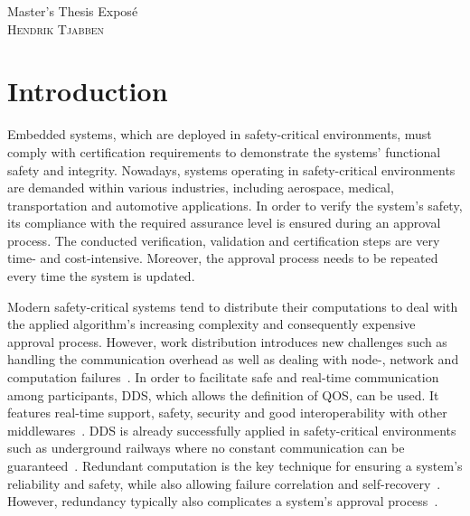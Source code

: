 \documentclass[a4paper, 12pt]{scrartcl}
\begin{document}
\begin{center}
  \Huge{Master's Thesis Expos\'{e}}\\
  \large{\textsc{Hendrik Tjabben}}
\end{center}


\section*{Introduction}
Embedded systems, which are deployed in safety-critical environments, must comply with certification requirements to demonstrate the systems' functional safety and integrity.
Nowadays, systems operating in safety-critical environments are demanded within various industries, including aerospace, medical, transportation and automotive applications.
In order to verify the system's safety, its compliance with the required assurance level is ensured during an approval process.
The conducted verification, validation and certification steps are very time- and cost-intensive.
Moreover, the approval process needs to be repeated every time the system is updated.

Modern safety-critical systems tend to distribute their computations to deal with the applied algorithm's increasing complexity and consequently expensive approval process.
However, work distribution introduces new challenges such as handling the communication overhead as well as dealing with node-, network and computation failures~\cite{DistributedSafety2020}.
In order to facilitate safe and real-time communication among participants, \ac{DDS}, which allows the definition of \ac{QOS}, can be used.
It features real-time support, safety, security and good interoperability with other middlewares~\cite{DistributedSafety2020}.
\ac{DDS} is already successfully applied in safety-critical environments such as underground railways where no constant communication can be guaranteed~\cite{DDSInURail}.
Redundant computation is the key technique for ensuring a system's reliability and safety, while also allowing failure correlation and self-recovery~\cite{TanenbaumSteen07}.
However, redundancy typically also complicates a system's approval process~\cite{ReliabilityThroughRedundancy}.

\end{document}

